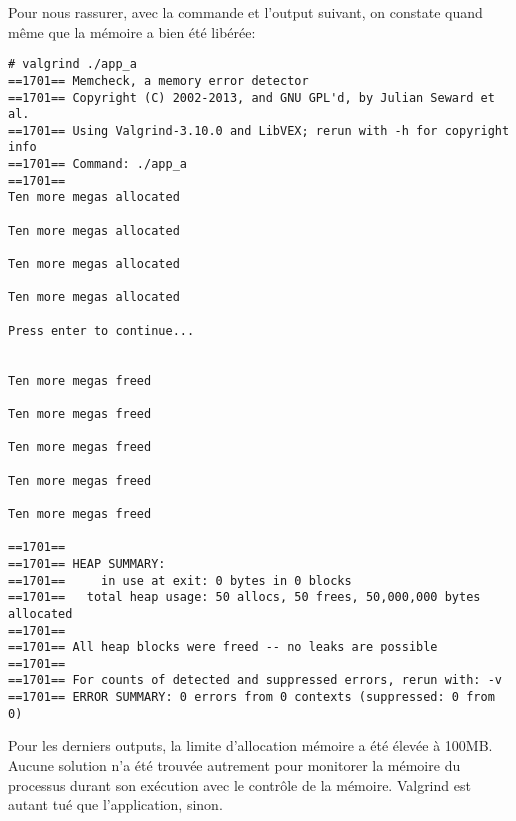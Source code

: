 Pour nous rassurer, avec la commande et l'output suivant, on constate quand même que la mémoire a bien été libérée:
\begin{lstlisting}
# valgrind ./app_a 
==1701== Memcheck, a memory error detector
==1701== Copyright (C) 2002-2013, and GNU GPL'd, by Julian Seward et al.
==1701== Using Valgrind-3.10.0 and LibVEX; rerun with -h for copyright info
==1701== Command: ./app_a
==1701== 
Ten more megas allocated

Ten more megas allocated

Ten more megas allocated

Ten more megas allocated

Press enter to continue...


Ten more megas freed

Ten more megas freed

Ten more megas freed

Ten more megas freed

Ten more megas freed

==1701== 
==1701== HEAP SUMMARY:
==1701==     in use at exit: 0 bytes in 0 blocks
==1701==   total heap usage: 50 allocs, 50 frees, 50,000,000 bytes allocated
==1701== 
==1701== All heap blocks were freed -- no leaks are possible
==1701== 
==1701== For counts of detected and suppressed errors, rerun with: -v
==1701== ERROR SUMMARY: 0 errors from 0 contexts (suppressed: 0 from 0)
\end{lstlisting}
Pour les derniers outputs, la limite d'allocation mémoire a été élevée à 100MB. Aucune solution n'a été trouvée autrement pour monitorer la mémoire du processus durant son exécution avec le contrôle de la mémoire. Valgrind est autant tué que l'application, sinon.
